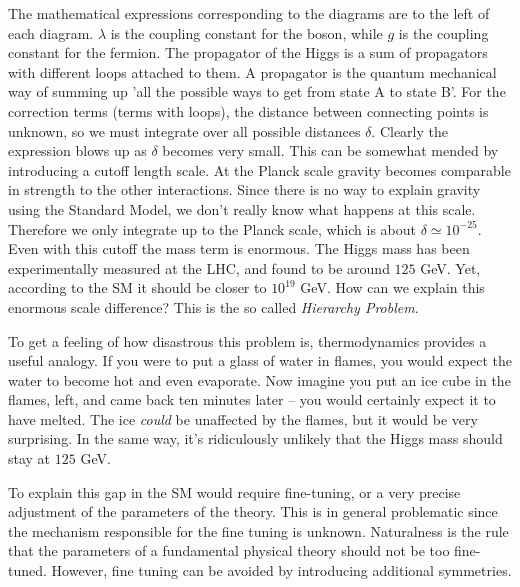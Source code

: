 \documentclass[11pt]{article}
\begin{document}
\begin{flushleft}
\begin{figure}[H]
\begin{flushleft}

\end{flushleft}
\end{figure}
The mathematical expressions corresponding to the diagrams are to the left of each diagram. $\lambda$ is the coupling constant for the boson, while $g$ is the coupling constant for the fermion. The propagator of the Higgs is a sum of propagators with different loops attached to them. A propagator is the quantum mechanical way of summing up 'all the possible ways to get from state A to state B'. For the correction terms (terms with loops), the distance between connecting points is unknown, so we must integrate over all possible distances $\delta$.  Clearly the expression blows up as $\delta$ becomes very small. This can be somewhat mended by introducing a cutoff length scale. At the Planck scale gravity becomes comparable in strength to the other interactions. Since there is no way to explain gravity using the Standard Model, we don't really know what happens at this scale. Therefore we only integrate up to the Planck scale, which is about $\delta \simeq 10^{-25}$. Even with this cutoff the mass term is enormous. The Higgs mass has been experimentally measured at the LHC, and found to be around $125$ GeV. Yet, according to the SM it should be closer to $10^{19}$ GeV. How can we explain this enormous scale difference? This is the so called \textit{Hierarchy Problem}. 
\end{flushleft}

\begin{flushleft}
To get a feeling of how disastrous this problem is, thermodynamics provides a useful analogy. If you were to put a glass of water in flames, you would expect the water to become hot and even evaporate. Now imagine you put an ice cube in the flames, left, and came back ten minutes later -- you would certainly expect it to have melted. The ice \textit{could} be unaffected by the flames, but it would be very surprising. In the same way, it's ridiculously unlikely that the Higgs mass should stay at $125$ GeV.
\end{flushleft}

\begin{flushleft}
To explain this gap in the SM would require fine-tuning, or a very precise adjustment of the parameters of the theory. This is in general problematic since the mechanism responsible for the fine tuning is unknown. Naturalness is the rule that the parameters of a fundamental physical theory should not be too fine-tuned. However, fine tuning can be avoided by introducing additional symmetries.
\end{flushleft}
\end{document}
